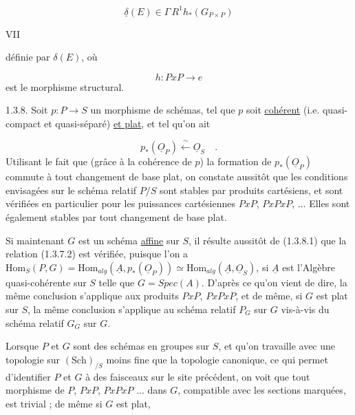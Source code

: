 \begin{equation*}
\underline{\delta}(E) \in \Gamma\, R^1 h_*(G_{P\times P}) 
\end{equation*}



VII

 définie par $\delta(E)$, où

\begin{equation*}
h : PxP \longrightarrow e
\end{equation*}
est le morphisme structural.

1.3.8.  Soit $p : P \longrightarrow S$ un morphisme de schémas, tel que $p$ soit \underline{cohérent} (i.e. quasi-compact et quasi-séparé) \underline{et plat}, et tel qu'on ait

\begin{equation}\tag{1.3.8.1}
p_*(\underline{O}_P) \xleftarrow{\ \sim\ } \underline{O}_S \quad .
\end{equation}
Utilisant le fait que (grâce à la cohérence de $p$) la formation de $p_*(\underline{O}_P)$ commute à tout changement de base plat, on constate aussitôt que les conditions envisagées sur le schéma relatif $P/S$ sont stables par produits cartésiens, et sont vérifiées en particulier pour les puissances cartésiennes $PxP$, $PxPxP$, ... Elles sont également stables par tout changement de base plat.

Si maintenant $G$ est un schéma \underline{affine} sur $S$, il résulte aussitôt de (1.3.8.1) que la relation (1.3.7.2) est vérifiée, puisque l'on a $\mathrm{Hom}_S(P,G) = \mathrm{Hom}_{alg}(\underline{A},p_*(\underline{O}_P)) \simeq \mathrm{Hom}_{alg}(\underline{A},\underline{O}_S)$, si $\underline{A}$ est l'Algèbre quasi-cohérente sur $S$ telle que $G = Spec(A)$. D'après ce qu'on vient de dire, la même conclusion s'applique aux produits $PxP$, $PxPxP$, et de même, si $G$ est plat sur $S$, la même conclusion s'applique au schéma relatif $P_G$ sur $G$ vis-à-vis du schéma relatif $G_G$ sur $G$.

Lorsque $P$ et $G$ sont des schémas en groupes sur $S$, et qu'on travaille avec une topologie sur $(\mathrm{Sch})_{/S}$ moins fine que la topologie canonique, ce qui permet d'identifier $P$ et $G$ à des faisceaux sur le site précédent, on voit que tout morphisme de $P$, $PxP$, $PxPxP$ ... dans $G$, compatible avec les sections marquées, est trivial ; de même si $G$ est plat, 



